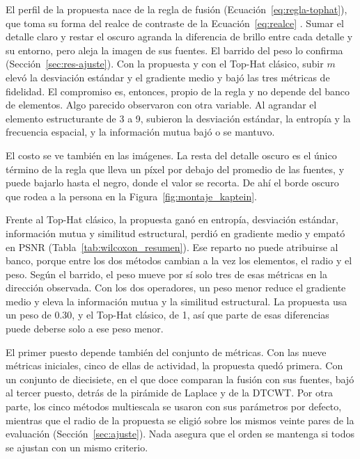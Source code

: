 El perfil de la propuesta nace de la regla de fusión (Ecuación~\ref{eq:regla-tophat}), que toma su forma del realce de
contraste de la Ecuación~\eqref{eq:realce} \parencite{bai2012}. Sumar el detalle claro y restar el oscuro
agranda la diferencia de brillo entre cada detalle y su entorno, pero aleja la imagen de sus fuentes. El
barrido del peso lo confirma (Sección~\ref{sec:res-ajuste}). Con la propuesta y con el Top-Hat clásico,
subir $m$ elevó la desviación estándar y el gradiente medio y bajó las tres métricas de fidelidad. El
compromiso es, entonces, propio de la regla y no depende del banco de elementos. Algo parecido observaron
\textcite{bajacfigueredo2024} con otra variable. Al agrandar el elemento estructurante de 3 a 9,
subieron la desviación estándar, la entropía y la frecuencia espacial, y la información mutua bajó o se
mantuvo.

El costo se ve también en las imágenes. La resta del detalle oscuro es el único término de la regla que
lleva un píxel por debajo del promedio de las fuentes, y puede bajarlo hasta el negro, donde el valor se
recorta. De ahí el borde oscuro que rodea a la persona en la Figura~\ref{fig:montaje_kaptein}.

Frente al Top-Hat clásico, la propuesta ganó en entropía, desviación estándar, información mutua y
similitud estructural, perdió en gradiente medio y empató en PSNR (Tabla~\ref{tab:wilcoxon_resumen}). Ese
reparto no puede atribuirse al banco, porque entre los dos métodos cambian a la vez los elementos, el radio
y el peso. Según el barrido, el peso mueve por sí solo tres de esas métricas en la dirección
observada. Con los dos operadores, un peso menor reduce el gradiente medio y eleva la
información mutua y la similitud estructural. La propuesta usa un peso de 0.30, y el Top-Hat clásico,
de 1, así que parte de esas diferencias puede deberse solo a ese peso menor.

El primer puesto depende también del conjunto de métricas. Con las nueve métricas iniciales, cinco de
ellas de actividad, la propuesta quedó primera. Con un conjunto de diecisiete, en el que doce comparan
la fusión con sus fuentes, bajó al tercer puesto, detrás de la pirámide de Laplace y de la DTCWT. Por
otra parte, los cinco métodos multiescala se usaron con sus parámetros por defecto, mientras que el radio
de la propuesta se eligió sobre los mismos veinte pares de la evaluación (Sección~\ref{sec:ajuste}).
Nada asegura que el orden se mantenga si todos se ajustan con un mismo criterio.

